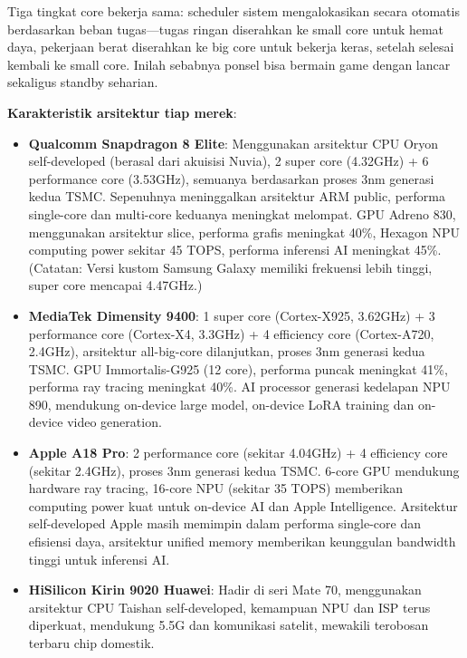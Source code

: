Tiga tingkat core bekerja sama: scheduler sistem mengalokasikan secara otomatis berdasarkan beban tugas—tugas ringan diserahkan ke small core untuk hemat daya, pekerjaan berat diserahkan ke big core untuk bekerja keras, setelah selesai kembali ke small core. Inilah sebabnya ponsel bisa bermain game dengan lancar sekaligus standby seharian.

\textbf{Karakteristik arsitektur tiap merek}:

\begin{itemize}
  \item \textbf{Qualcomm Snapdragon 8 Elite}: Menggunakan arsitektur CPU Oryon self-developed (berasal dari akuisisi Nuvia), 2 super core (4.32GHz) + 6 performance core (3.53GHz), semuanya berdasarkan proses 3nm generasi kedua TSMC. Sepenuhnya meninggalkan arsitektur ARM public, performa single-core dan multi-core keduanya meningkat melompat. GPU Adreno 830, menggunakan arsitektur slice, performa grafis meningkat 40\%, Hexagon NPU computing power sekitar 45 TOPS, performa inferensi AI meningkat 45\%. (Catatan: Versi kustom Samsung Galaxy memiliki frekuensi lebih tinggi, super core mencapai 4.47GHz.)
  \item \textbf{MediaTek Dimensity 9400}: 1 super core (Cortex-X925, 3.62GHz) + 3 performance core (Cortex-X4, 3.3GHz) + 4 efficiency core (Cortex-A720, 2.4GHz), arsitektur all-big-core dilanjutkan, proses 3nm generasi kedua TSMC. GPU Immortalis-G925 (12 core), performa puncak meningkat 41\%, performa ray tracing meningkat 40\%. AI processor generasi kedelapan NPU 890, mendukung on-device large model, on-device LoRA training dan on-device video generation.
  \item \textbf{Apple A18 Pro}: 2 performance core (sekitar 4.04GHz) + 4 efficiency core (sekitar 2.4GHz), proses 3nm generasi kedua TSMC. 6-core GPU mendukung hardware ray tracing, 16-core NPU (sekitar 35 TOPS) memberikan computing power kuat untuk on-device AI dan Apple Intelligence. Arsitektur self-developed Apple masih memimpin dalam performa single-core dan efisiensi daya, arsitektur unified memory memberikan keunggulan bandwidth tinggi untuk inferensi AI.
  \item \textbf{HiSilicon Kirin 9020 Huawei}: Hadir di seri Mate 70, menggunakan arsitektur CPU Taishan self-developed, kemampuan NPU dan ISP terus diperkuat, mendukung 5.5G dan komunikasi satelit, mewakili terobosan terbaru chip domestik.
\end{itemize}


